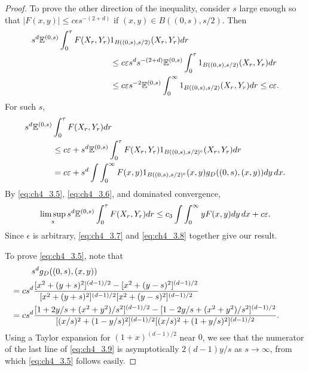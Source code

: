 \begin{proof}
To prove the other direction of the inequality, consider $s$ large enough so that $|F(x,y)| \leq c\epsilon s^{-(2+d)}$ if $(x,y) \in B((0,s),s/2)$. Then
\begin{align*}
    s^d\mathbb{E}^{(0,s)} \int_0^{\tau} F(X_r,Y_r)&1_{B((0,s),s/2)}(X_r,Y_r)dr \\
    &\leq c\varepsilon s^d s^{-(2+d)}\mathbb{E}^{(0,s)}\int_0^{\tau} 1_{B((0,s),s/2)}(X_r,Y_r)dr \\
    &\leq c\varepsilon s^{-2}\mathbb{E}^{(0,s)}\int_0^{\infty} 1_{B((0,s),s/2)}(X_r,Y_r)dr \leq c\varepsilon.
\end{align*}
For such $s$,
\begin{align*}
    s^d\mathbb{E}^{(0,s)} &\int_0^{\tau} F(X_r,Y_r)dr \\
    &\leq c\varepsilon +s^d\mathbb{E}^{(0,s)} \int_0^{\tau} F(X_r,Y_r)1_{B((0,s),s/2)^c}(X_r,Y_r)dr \\
    &= c\varepsilon + s^d\int\int_0^\infty F(x,y)1_{B((0,s),s/2)^c}(x,y)g_D((0,s),(x,y)) dy\,dx.
\end{align*}
By \eqref{eq:ch4_3.5}, \eqref{eq:ch4_3.6}, and dominated convergence,
\mpagebreak
\begin{equation}\label{eq:ch4_3.8}
    \limsup_s s^d\mathbb{E}^{(0,s)} \int_0^{\tau} F(X_r,Y_r)dr \leq c_3\int\int_0^{\infty} yF(x,y) dy\,dx + c\varepsilon.
\end{equation}
Since $\epsilon$ is arbitrary, \eqref{eq:ch4_3.7} and \eqref{eq:ch4_3.8} together give our result.

To prove \eqref{eq:ch4_3.5}, note that
\begin{align}\label{eq:ch4_3.9}
    \raisetag{-1.4\baselineskip}
    &s^d g_D((0,s),(x,y)) \\
    &\hspace{-2.45em}= cs^d\frac{[x^2 + (y+s)^2]^{(d-1)/2} - [x^2 + (y-s)^2]^{(d-1)/2}}{[x^2 + (y+s)^2]^{(d-1)/2}[x^2 + (y-s)^2]^{(d-1)/2}} \notag \\
    &\hspace{-2.45em}= cs^d\frac{[1+2y/s + (x^2+y^2)/s^2]^{(d-1)/2} - [1-2y/s + (x^2+y^2)/s^2]^{(d-1)/2}}{[(x/s)^2 + (1-y/s)^2]^{(d-1)/2}[(x/s)^2 + (1+y/s)^2]^{(d-1)/2}}. \notag
\end{align}
Using a Taylor expansion for $(1+x)^{(d-1)/2}$ near $0$, we see that the numerator of the last line of \eqref{eq:ch4_3.9} is asymptotically $2(d-1)y/s$ as $s \to \infty$, from which \eqref{eq:ch4_3.5} follows easily.


\end{proof}
